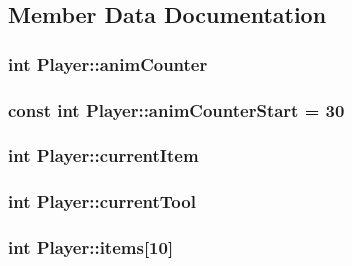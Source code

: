 \subsection{Member Data Documentation}
\hypertarget{class_player_aa4536c3254fa3b774cd5b04483a3255b}{
\subsubsection[{anim\-Counter}]{\setlength{\rightskip}{0pt plus 5cm}int {\bf Player\-::anim\-Counter}}}\label{class_player_aa4536c3254fa3b774cd5b04483a3255b}
\hypertarget{class_player_af6cb41cc776191c988c8fa835fd12bc4}{
\subsubsection[{anim\-Counter\-Start}]{\setlength{\rightskip}{0pt plus 5cm}const int {\bf Player\-::anim\-Counter\-Start} = 30}}\label{class_player_af6cb41cc776191c988c8fa835fd12bc4}
\hypertarget{class_player_ab3f59417c9a2ee2d8a39a7a20f18dd51}{
\subsubsection[{current\-Item}]{\setlength{\rightskip}{0pt plus 5cm}int {\bf Player\-::current\-Item}}}\label{class_player_ab3f59417c9a2ee2d8a39a7a20f18dd51}
\hypertarget{class_player_aec48acba12d8b9245b4ba09146e0113c}{
\subsubsection[{current\-Tool}]{\setlength{\rightskip}{0pt plus 5cm}int {\bf Player\-::current\-Tool}}}\label{class_player_aec48acba12d8b9245b4ba09146e0113c}
\hypertarget{class_player_a6bcb0c797b73c3ea5e3d8ef797656c92}{
\subsubsection[{items}]{\setlength{\rightskip}{0pt plus 5cm}int {\bf Player\-::items}\mbox{[}10\mbox{]}}}\label{class_player_a6bcb0c797b73c3ea5e3d8ef797656c92}

